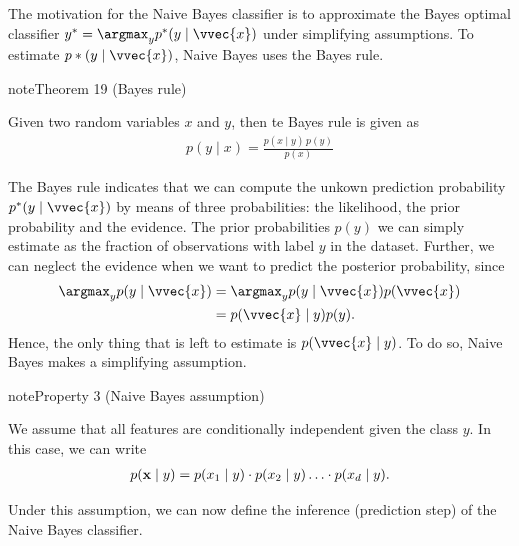 \documentclass[letterpaper,10pt,english]{jupyterBook}
\begin{document}
\sphinxAtStartPar
The motivation for the Naive Bayes classifier is to approximate the Bayes optimal classifier \(y^*=\argmax_y p^*(y\mid\vvec{x})\) under simplifying assumptions. To estimate \(p*(y\mid\vvec{x})\), Naive Bayes uses the Bayes rule.
\label{classification_naive_bayes:bayes_rule}
\begin{sphinxadmonition}{note}{Theorem 19 (Bayes rule)}



\sphinxAtStartPar
Given two random variables \(x\) and \(y\), then te Bayes rule is given as
\begin{equation*}
\begin{split} p(y \mid x) = \frac{p(x \mid y) \, p(y)}{p(x)}\end{split}
\end{equation*}
\end{sphinxadmonition}

\sphinxAtStartPar
The Bayes rule indicates that we can compute the unkown prediction probability \(p^*(y\mid \vvec{x})\) by means of three probabilities: the likelihood, the prior probability and the evidence. The prior probabilities \(p(y)\) we can simply estimate as the fraction of observations with label \(y\) in the dataset. Further, we can neglect the evidence when we want to predict the posterior probability, since
\begin{align*}
\argmax_y p(y\mid \vvec{x}) &= \argmax_y p(y\mid \vvec{x})p(\vvec{x})\\
&= p(\vvec{x}\mid y)p(y).
\end{align*}
\sphinxAtStartPar
Hence, the only thing that is left to estimate is \(p(\vvec{x}\mid y)\). To do so, Naive Bayes makes a simplifying assumption.
\label{classification_naive_bayes:property-2}
\begin{sphinxadmonition}{note}{Property 3 (Naive Bayes assumption)}



\sphinxAtStartPar
We assume that all features are conditionally independent given the class \(y\). In this case, we can write
\begin{equation}\label{equation:classification_naive_bayes:naive_assumption}
\begin{split}p({\bf x} \mid y) = p(x_1 \mid y)\cdot p(x_2\mid y) \ldots \cdot p(x_d\mid y) .\end{split}
\end{equation}\end{sphinxadmonition}

\sphinxAtStartPar
Under this assumption, we can now define the inference (prediction step) of the Naive Bayes classifier.
\end{document}
